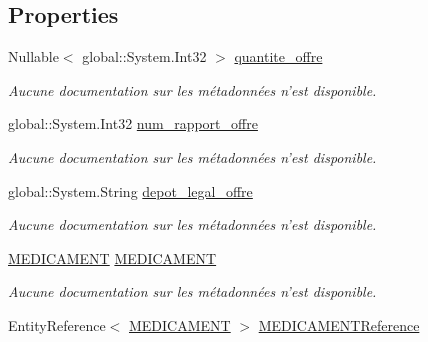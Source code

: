 \subsection*{Properties}
\begin{DoxyCompactItemize}
\item 
Nullable$<$ global\-::\-System.\-Int32 $>$ \hyperlink{class_model_1_1_o_f_f_r_e1_a87716ad990cd87804edfa1ae5eecd1f7}{quantite\-\_\-offre}
\begin{DoxyCompactList}\small\item\em Aucune documentation sur les métadonnées n'est disponible. \end{DoxyCompactList}\item 
global\-::\-System.\-Int32 \hyperlink{class_model_1_1_o_f_f_r_e1_ad57c3bdb1734c2de219aaf5267da7a33}{num\-\_\-rapport\-\_\-offre}
\begin{DoxyCompactList}\small\item\em Aucune documentation sur les métadonnées n'est disponible. \end{DoxyCompactList}\item 
global\-::\-System.\-String \hyperlink{class_model_1_1_o_f_f_r_e1_abd3803160cf8cdb50d1d357bf379d82b}{depot\-\_\-legal\-\_\-offre}
\begin{DoxyCompactList}\small\item\em Aucune documentation sur les métadonnées n'est disponible. \end{DoxyCompactList}\item 
\hyperlink{class_model_1_1_m_e_d_i_c_a_m_e_n_t}{M\-E\-D\-I\-C\-A\-M\-E\-N\-T} \hyperlink{class_model_1_1_o_f_f_r_e1_a2c69f629593dcb56e64724980441dfe6}{M\-E\-D\-I\-C\-A\-M\-E\-N\-T}
\begin{DoxyCompactList}\small\item\em Aucune documentation sur les métadonnées n'est disponible. \end{DoxyCompactList}\item 
Entity\-Reference$<$ \hyperlink{class_model_1_1_m_e_d_i_c_a_m_e_n_t}{M\-E\-D\-I\-C\-A\-M\-E\-N\-T} $>$ \hyperlink{class_model_1_1_o_f_f_r_e1_a7725364d8165f3e4da799655ca3650a0}{M\-E\-D\-I\-C\-A\-M\-E\-N\-T\-Reference}

\end{DoxyCompactItemize}
